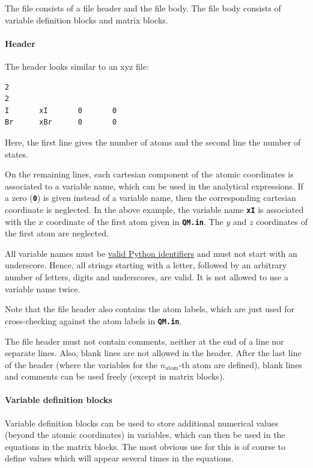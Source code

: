 \documentclass[a4paper,11pt,DIV=15,openany,twoside=false]{scrbook}
\newcommand{\ttt}[1]{\textbf{\texttt{#1}}}
\newenvironment{example}{
  \vspace{0mm}
  \definecolor{shadecolor}{HTML}{E4F4FF}
  \begin{shaded}
}{
  \end{shaded}
}
\begin{document}
The file consists of a file header and the file body. The file body consists of variable definition blocks and matrix blocks.

\paragraph{Header} 

The header looks similar to an xyz file:
\begin{example}
  \begin{verbatim}
2
2
I       xI       0       0
Br      xBr      0       0
  \end{verbatim}
\end{example}
Here, the first line gives the number of atoms and the second line the number of states. 

On the remaining lines, each cartesian component of the atomic coordinates is associated to a variable name, which can be used in the analytical expressions. If a zero (\ttt{0}) is given instead of a variable name, then the corresponding cartesian coordinate is neglected. In the above example, the variable name \ttt{xI} is associated with the $x$ coordinate of the first atom given in \ttt{QM.in}. The $y$ and $z$ coordinates of the first atom are neglected.

All variable names must be \href{https://docs.python.org/2/reference/lexical_analysis.html#identifiers}{valid Python identifiers} and must not start with an underscore. Hence, all strings starting with a letter, followed by an arbitrary number of letters, digits and underscores, are valid. It is not allowed to use a variable name twice.

Note that the file header also contains the atom labels, which are just used for cross-checking against the atom labels in \ttt{QM.in}.

The file header must not contain comments, neither at the end of a line nor separate lines. Also, blank lines are not allowed in the header. After the last line of the header (where the variables for the $n_{\text{atom}}$-th atom are defined), blank lines and comments can be used freely (except in matrix blocks).

\paragraph{Variable definition blocks}

Variable definition blocks can be used to store additional numerical values (beyond the atomic coordinates) in variables, which can then be used in the equations in the matrix blocks. The most obvious use for this is of course to define values which will appear several times in the equations.
\end{document}
